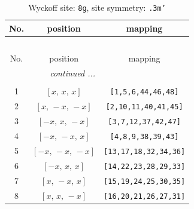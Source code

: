 \documentclass[fleqn,8pt]{jsarticle}
\begin{document}
\renewcommand{\arraystretch}{1.2}
\begin{longtable}{ccc}
\caption{Wyckoff site: {\tt 8g}, site symmetry: {\tt .3m'}}
 \\
 \hline \hline
No. & position & mapping \\ \hline \endfirsthead

\multicolumn{2}{l}{\tablename\ \thetable{}} \\
 \hline \hline
No. & position & mapping \\ \hline \endhead

 \hline \hline
\multicolumn{2}{r}{\footnotesize\it continued ...} \\ \endfoot

 \hline \hline
\multicolumn{2}{r}{} \\ \endlastfoot

1 & $\left[ x,\, x,\, x \right]$ & {\tt [1,5,6,44,46,48]} \\ \hline
2 & $\left[ x,\, - x,\, - x \right]$ & {\tt [2,10,11,40,41,45]} \\ \hline
3 & $\left[ - x,\, x,\, - x \right]$ & {\tt [3,7,12,37,42,47]} \\ \hline
4 & $\left[ - x,\, - x,\, x \right]$ & {\tt [4,8,9,38,39,43]} \\ \hline
5 & $\left[ - x,\, - x,\, - x \right]$ & {\tt [13,17,18,32,34,36]} \\ \hline
6 & $\left[ - x,\, x,\, x \right]$ & {\tt [14,22,23,28,29,33]} \\ \hline
7 & $\left[ x,\, - x,\, x \right]$ & {\tt [15,19,24,25,30,35]} \\ \hline
8 & $\left[ x,\, x,\, - x \right]$ & {\tt [16,20,21,26,27,31]} \\
\end{longtable}
\renewcommand{\arraystretch}{1.2}
\end{document}
